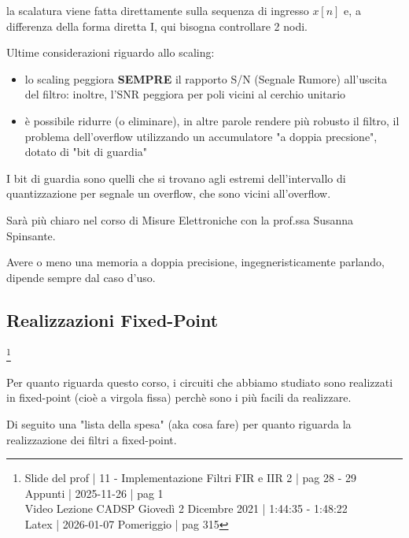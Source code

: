 la scalatura viene fatta direttamente sulla sequenza di ingresso $x \left[ n\right]$ e, a differenza della forma diretta I, qui bisogna controllare 2 nodi. \newline 

Ultime considerazioni riguardo allo scaling: 

\begin{itemize}
    \item lo scaling peggiora \textbf{SEMPRE} il rapporto S/N (Segnale Rumore) all'uscita del filtro: inoltre, l'SNR peggiora per poli vicini al cerchio unitario 
    \item è possibile ridurre (o eliminare), in altre parole rendere più robusto il filtro, il problema dell'overflow utilizzando un accumulatore "a doppia precsione", dotato di "bit di guardia" 
\end{itemize}

\begin{tcolorbox}
I bit di guardia sono quelli che si trovano agli estremi dell'intervallo di quantizzazione per segnale un overflow, che sono vicini all'overflow. \newline 

Sarà più chiaro nel corso di Misure Elettroniche con la prof.ssa Susanna Spinsante. \newline 

Avere o meno una memoria a doppia precisione, ingegneristicamente parlando, dipende sempre dal caso d'uso. 
\end{tcolorbox}

\newpage 

\subsection{Realizzazioni Fixed-Point}

\footnote{ 
    Slide del prof | 11 - Implementazione Filtri FIR e IIR 2 | pag 28 - 29\\
    Appunti | 2025-11-26 | pag 1 \\ 
    Video Lezione CADSP Giovedì 2 Dicembre 2021 | 1:44:35 - 1:48:22 \\ 
    Latex | 2026-01-07 Pomeriggio | pag 315       
} 

Per quanto riguarda questo corso, i circuiti che abbiamo studiato sono realizzati in fixed-point (cioè a virgola fissa) perchè sono i più facili da realizzare. \newline 

Di seguito una "lista della spesa" (aka cosa fare) per quanto riguarda la realizzazione dei filtri a fixed-point. \newline 

